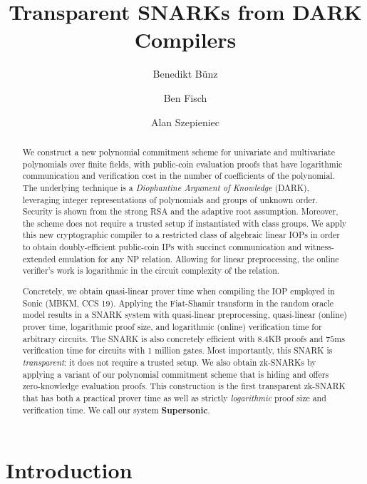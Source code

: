 \documentclass[11pt]{article}
\date{}
\theoremstyle{definition}
\begin{document}
\title{Transparent SNARKs from DARK Compilers}
 \author[1]{Benedikt B\"unz}
 \author[1]{Ben Fisch} 
 \author[2]{Alan Szepieniec} 
\maketitle

\begin{abstract} 
We construct a new polynomial commitment scheme for univariate and multivariate polynomials over finite fields, with public-coin evaluation proofs that have logarithmic communication and verification cost in the number of coefficients of the polynomial. The underlying technique is a \emph{Diophantine Argument of Knowledge} (DARK), leveraging integer representations of polynomials and groups of unknown order. Security is shown from the strong RSA and the adaptive root assumption. Moreover, the scheme does not require a trusted setup if instantiated with class groups. We apply this new cryptographic compiler to a restricted class of algebraic linear IOPs in order to obtain doubly-efficient public-coin IPs with succinct communication and witness-extended emulation for any NP relation. Allowing for linear preprocessing, the online verifier's work is logarithmic in the circuit complexity of the relation.

Concretely, we obtain quasi-linear prover time when compiling the IOP employed in Sonic (MBKM, CCS 19). Applying the Fiat-Shamir transform in the random oracle model results in a SNARK system with quasi-linear preprocessing, quasi-linear (online) prover time, logarithmic proof size, and logarithmic (online) verification time for arbitrary circuits. The SNARK is also concretely efficient with $8.4$KB proofs and $75$ms verification time for circuits with 1 million gates. Most importantly, this SNARK is \emph{transparent}: it does not require a trusted setup. We also obtain zk-SNARKs by applying a variant of our polynomial commitment scheme that is hiding and offers zero-knowledge evaluation proofs. This construction is the first transparent zk-SNARK that has both a practical prover time as well as strictly \emph{logarithmic} proof size and verification time. We call our system \textsf{\textbf{Supersonic}}.

\end{abstract} 

\section{Introduction}
 
\end{document}
